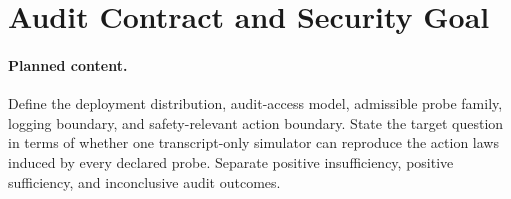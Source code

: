 \section{Audit Contract and Security Goal}
\label{sec:audit-contract}

\paragraph{Planned content.}
Define the deployment distribution, audit-access model, admissible probe
family, logging boundary, and safety-relevant action boundary. State the target
question in terms of whether one transcript-only simulator can reproduce the
action laws induced by every declared probe. Separate positive insufficiency,
positive sufficiency, and inconclusive audit outcomes.
